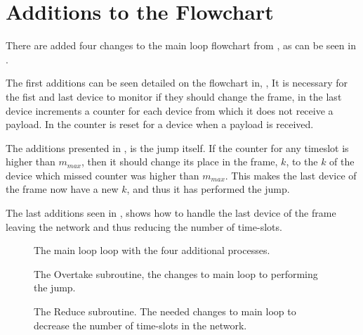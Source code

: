 \section{Additions to the Flowchart}
There are added four changes to the main loop flowchart from , as can be seen in .

The first additions can be seen detailed on the flowchart in, ,
It is necessary for the fist and last device to monitor if they should change the frame, in  the last device increments a counter for each device from which it does not receive a payload.
In  the counter is reset for a device when a payload is received.

The additions presented in , is the jump itself.
If the counter for any timeslot is higher than $m_{max}$, then it should change its place in the frame, $k$, to the $k$ of the device which missed counter was higher than $m_{max}$.
This makes the last device of the frame now have a new $k$, and thus it has performed the jump.	

The last additions seen in , shows how to handle the last device of the frame leaving the network and thus reducing the number of time-slots.
                                                                         
\begin{figure}[p]
\centering
\footnotesize

\caption{The main loop loop with the four additional processes.}
\label{fig:mainFrameDefrag}    
\end{figure}  

  

\begin{figure}[p]
\centering
\footnotesize

\caption{The Overtake subroutine, the changes to main loop to performing the jump.}
\label{fig:jd2}    
\end{figure}

\begin{figure}[p]
\centering
\footnotesize

\caption{The Reduce subroutine. The needed changes to main loop to decrease the number of time-slots in the network.}
\label{fig:jd3}    
\end{figure}   


